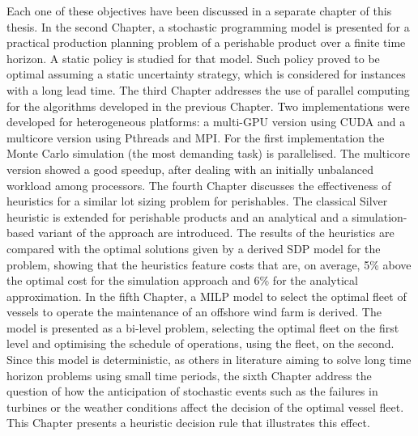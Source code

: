 \begin{abstractslongEnglish}
Each one of these objectives have been discussed in a separate chapter of this thesis. In the second Chapter, a stochastic programming model is presented for a practical production planning problem of a perishable product over a finite time horizon. A static policy is studied for that model.  Such policy proved to be optimal assuming a static uncertainty strategy, which is considered for instances with a long lead time. The third Chapter addresses the use of parallel computing for the algorithms developed in the previous Chapter. Two implementations were developed for heterogeneous platforms: a multi-GPU version using CUDA and a multicore version using Pthreads and MPI. For the first implementation the Monte Carlo simulation (the most demanding task) is parallelised. The multicore version showed a good speedup, after dealing with an initially unbalanced workload among processors. The fourth Chapter discusses the effectiveness of heuristics for a similar lot sizing problem for perishables. The classical Silver heuristic is extended for perishable products and an analytical and a simulation-based variant of the approach are introduced. The results of the heuristics are compared with the optimal solutions given by a derived SDP model for the problem, showing that the heuristics feature costs that are, on average, 5\% above the optimal cost for the simulation approach and 6\% for the analytical approximation. In the fifth Chapter, a MILP model to select the optimal fleet of vessels to operate the maintenance of an offshore wind farm is derived. The model is presented as a bi-level problem, selecting the optimal fleet on the first level and optimising the schedule of operations, using the fleet, on the second. Since this model is deterministic, as others in literature aiming to solve long time horizon problems using small time periods, the sixth Chapter address the question of how the anticipation of stochastic events such as the failures in turbines or the weather conditions affect the decision of the optimal vessel fleet. This Chapter presents a heuristic decision rule that  illustrates this effect.
\end{abstractslongEnglish} 